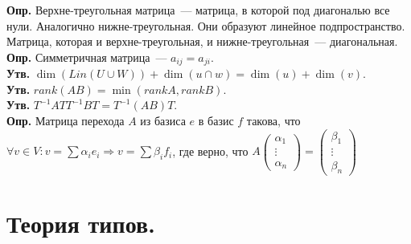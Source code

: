 \documentclass{article}
\begin{document}
	\textbf{Опр.} Верхне-треугольная матрица~--- матрица, в которой под диагональю все нули. Аналогично нижне-треугольная. Они образуют линейное подпространство. Матрица, которая и верхне-треугольная, и нижне-треугольная~--- диагональная. \\
	\textbf{Опр.} Симметричная матрица~--- $a_{ij} = a_{ji}$. \\
	\textbf{Утв.} $\dim(Lin(U \cup W)) + \dim(u \cap w) = \dim(u) + \dim(v)$. \\
	\textbf{Утв.} $rank(AB) = \min(rank A, rank B)$. \\
	\textbf{Утв.} $T^{-1} A T T^{-1} B T = T^{-1} (A B) T$. \\
	\textbf{Опр.} Матрица перехода $A$ из базиса $e$ в базис $f$ такова, что $\forall v \in V: v = \sum \alpha_i e_i \Rightarrow v = \sum \beta_i f_i$, где верно, что $A
	\left( \begin{smallmatrix}
		\alpha_1 \\
		\vdots \\
		\alpha_n
	\end{smallmatrix} \right) =
	\left( \begin{smallmatrix}
		\beta_1 \\
		\vdots \\
		\beta_n
	\end{smallmatrix} \right)
	$
	
	
	
	
	
	\newpage
	\section{Теория типов.}
\end{document}
